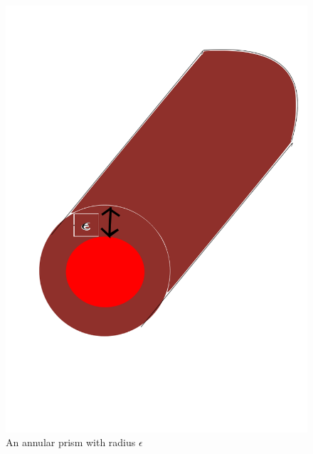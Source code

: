 \documentclass[10pt]{amsart} %
\theoremstyle{definition}
\begin{document}
\begin{figure}[h]

              \centering
               \includegraphics[scale=0.25]{anprism.png}
                \caption{An annular prism with radius $\epsilon$}\label{fig:a}
\end{figure}
\end{document}
